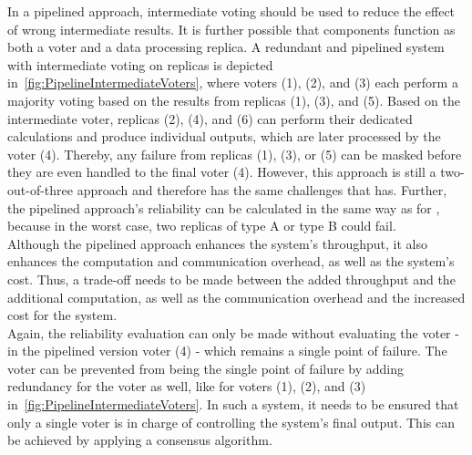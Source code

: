 In a pipelined approach, intermediate voting should be used to reduce the effect of wrong intermediate results.
It is further possible that components function as both a voter and a data processing replica.
A redundant and pipelined system with intermediate voting on replicas is depicted in~\autoref{fig:PipelineIntermediateVoters}, where voters (1), (2), and (3) each perform a majority voting based on the results from replicas (1), (3), and (5).
Based on the intermediate voter, replicas (2), (4), and (6) can perform their dedicated calculations and produce individual outputs, which are later processed by the voter (4).
Thereby, any failure from replicas (1), (3), or (5) can be masked before they are even handled to the final voter (4).
However, this approach is still a two-out-of-three approach and therefore has the same challenges that  has.
Further, the pipelined approach's reliability can be calculated in the same way as for , because in the worst case, two replicas of type A or type B could fail.
\\

Although the pipelined approach enhances the system's throughput, it also enhances the computation and communication overhead, as well as the system's cost.
Thus, a trade-off needs to be made between the added throughput and the additional computation,  as well as the communication overhead and the increased cost for the system.
\\

Again, the reliability evaluation can only be made without evaluating the voter - in the pipelined version voter (4) - which remains a single point of failure.
The voter can be prevented from being the single point of failure by adding redundancy for the voter as well, like for voters (1), (2), and (3) in~\autoref{fig:PipelineIntermediateVoters}.
In such a system, it needs to be ensured that only a single voter is in charge of controlling the system's final output.
This can be achieved by applying a consensus algorithm.

